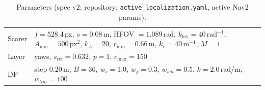 \documentclass[10pt,twocolumn]{article}
\begin{document}
\begin{table}[t]
\centering\footnotesize
\caption{Parameters (spec v2; repository: \texttt{active\_localization.yaml}, active Nav2 params).}
\label{tab:params}
\begin{tabularx}{\columnwidth}{@{}l>{\raggedright\arraybackslash}X@{}}
\toprule
Scorer & $f=528.4$\,px, $s=0.08$\,m, HFOV $=1.089$\,rad, $k_{\mathrm{fov}}=40$\,rad$^{-1}$, $A_{\min}=500$\,px$^2$, $k_A=20$, $r_{\min}=0.66$\,m, $k_r=40$\,m$^{-1}$, $M=1$ \\
Layer & 36 yaws, $s_{\mathrm{ref}}=0.632$, $p=1$, $c_{\max}=150$ \\
DP & step 0.20\,m, $B=36$, $w_s=1.0$, $w_f=0.3$, $w_{sm}=0.5$, $k=2.0$\,rad/m, $w_{lim}=100$ \\
\bottomrule
\end{tabularx}
\end{table}
\end{document}
